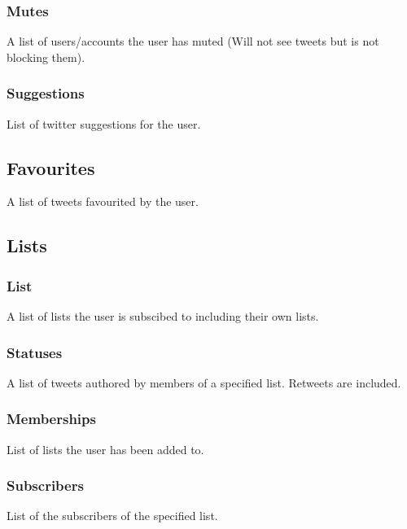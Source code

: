 \documentclass{article}
\begin{document}
		\subsubsection{Mutes}
			A list of users/accounts the user has muted (Will not see tweets but is not blocking them).

		\subsubsection{Suggestions}
			List of twitter suggestions for the user.

	\subsection{Favourites}
		A list of tweets favourited by the user.

	\subsection{Lists}
		\subsubsection{List}
			A list of lists the user is subscibed to including their own lists.

		\subsubsection{Statuses}
			A list of tweets authored by members of a specified list. Retweets are included.

		\subsubsection{Memberships}
			List of lists the user has been added to.

		\subsubsection{Subscribers}
			List of the subscribers of the specified list.
\end{document}
